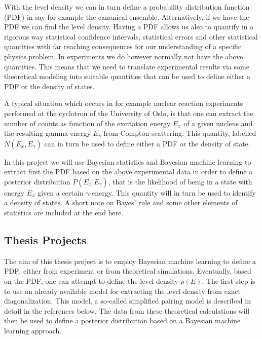 \documentclass[%
oneside,                 %
final,                   %
10pt]{article}
\begin{document}
With the level density we can in turn define a probability
distribution function (PDF) in say for example the canonical
ensemble. Alternatively, if we have the PDF we can find the level density.
Having a PDF allows us also to quantify in a rigorous way statistical
confidence intervals, statistical errors and other statistical quantities with far reaching
consequences for our understanding of a specific physics problem. 
In experiments we do however normally not have the above
quantities. This means that we need to translate experimental results
via some theoretical modeling into suitable quantities that can be
used to define either a PDF or the density of states.

A typical situation which occurs in for example nuclear reaction
experiments performed at the cyclotron of the University of Oslo, is
that one can extract the number of counts as function of the
excitation energy $E_x$ of a given nucleus and the resulting gamma
energy $E_{\gamma}$ from Compton scattering. This quantity, labelled
$N(E_x,E_{\gamma})$ can in turn be used to define either a PDF or the
density of state.


In this project we will use Bayesian statistics and Bayesian machine
learning to extract first the PDF based on the above experimental data
in order to define a posterior distribution $P(E_x\vert E_{\gamma})$,
that is the likelihood of being in  a state with  energy $E_x$ given a certain
$\gamma$-energy.  This quantity will in turn be used to identify a
density of states. A short note on Bayes' rule and some other elements
of statistics are included at the end here.


\subsection{Thesis Projects}

The aim of this thesis project is to employ Bayesian machine learning to
define a PDF, either from experiment or from theoretical simulations.
Eventually, based on the PDF, one can attempt to define the level density
$\rho(E)$. The first step is to use an
already available model for extracting the level density from exact
diagonalization. This model, a so-called simplified pairing model is
described in detail in the references below.
The 
data from these theoretical calculations
will then be used to define a posterior distribution based on a
Bayesian machine learning approach.
\end{document}
